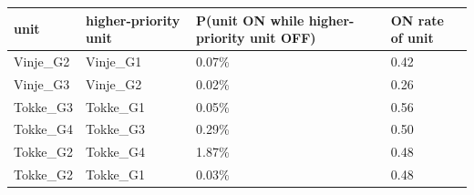 \begin{tabular}{llll}
\toprule
\textbf{unit} & \textbf{higher-priority unit} & \textbf{P(unit ON while higher-priority unit OFF)} & \textbf{ON rate of unit} \\
\midrule
Vinje\_\allowbreak{}G2 & Vinje\_\allowbreak{}G1 & 0.07\% & 0.42 \\
Vinje\_\allowbreak{}G3 & Vinje\_\allowbreak{}G2 & 0.02\% & 0.26 \\
Tokke\_\allowbreak{}G3 & Tokke\_\allowbreak{}G1 & 0.05\% & 0.56 \\
Tokke\_\allowbreak{}G4 & Tokke\_\allowbreak{}G3 & 0.29\% & 0.50 \\
Tokke\_\allowbreak{}G2 & Tokke\_\allowbreak{}G4 & 1.87\% & 0.48 \\
Tokke\_\allowbreak{}G2 & Tokke\_\allowbreak{}G1 & 0.03\% & 0.48 \\
\bottomrule
\end{tabular}
